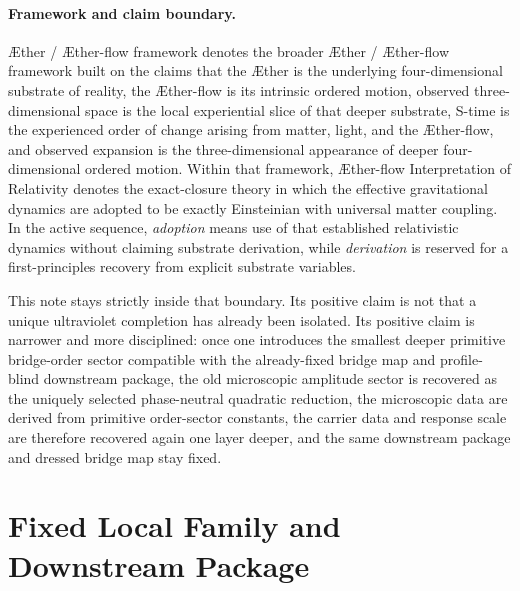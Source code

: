 \documentclass[11pt]{article}
\newcommand{\Aether}{\AE{}ther}
\newcommand{\Aflow}{\AE{}ther-flow}
\newcommand{\TheoryName}{\Aflow{} Interpretation of Relativity}
\newcommand{\TheoryProgram}{\Aether{} / \Aflow{} framework}
\begin{document}
\paragraph{Framework and claim boundary.}
\TheoryProgram{} denotes the broader \Aether{} / \Aflow{} framework built on the claims that the \Aether{} is the underlying four-dimensional substrate of reality, the \Aflow{} is its intrinsic ordered motion, observed three-dimensional space is the local experiential slice of that deeper substrate, S-time is the experienced order of change arising from matter, light, and the \Aflow{}, and observed expansion is the three-dimensional appearance of deeper four-dimensional ordered motion. Within that framework, \TheoryName{} denotes the exact-closure theory in which the effective gravitational dynamics are adopted to be exactly Einsteinian with universal matter coupling. In the active sequence, \emph{adoption} means use of that established relativistic dynamics without claiming substrate derivation, while \emph{derivation} is reserved for a first-principles recovery from explicit substrate variables.

This note stays strictly inside that boundary. Its positive claim is not that a unique ultraviolet completion has already been isolated. Its positive claim is narrower and more disciplined: once one introduces the smallest deeper primitive bridge-order sector compatible with the already-fixed bridge map and profile-blind downstream package, the old microscopic amplitude sector is recovered as the uniquely selected phase-neutral quadratic reduction, the microscopic data are derived from primitive order-sector constants, the carrier data and response scale are therefore recovered again one layer deeper, and the same downstream package and dressed bridge map stay fixed.

\section{Fixed Local Family and Downstream Package}
\end{document}
